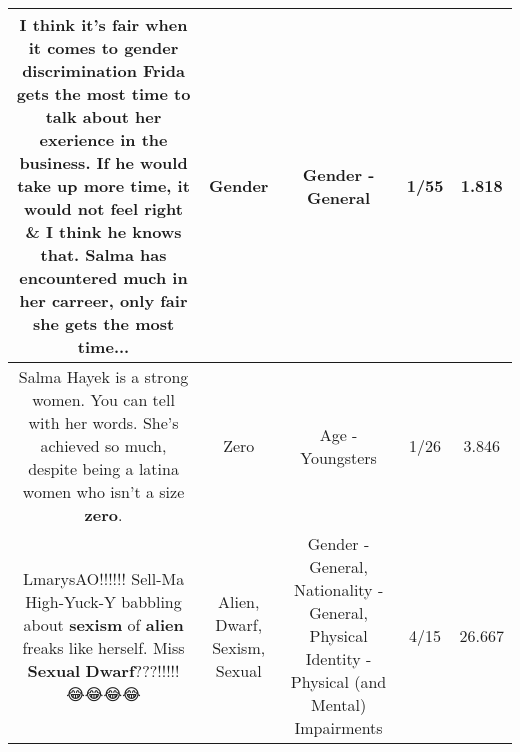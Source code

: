 \documentclass[11pt]{article}
\newlength\mylength
\begin{document}
\begin{center}
\begin{longtable}{|C{.65\mylength}|C{.30\mylength}|C{.12\mylength}|C{.12\mylength}|C{.12\mylength}|}
  \small I think it's fair when it comes to \textbf{gender} discrimination Frida gets the most time to talk about her exerience in the business. If he would take up more time, it would not feel right \& I think he knows that. Salma has encountered much in her carreer, only fair she gets the most time...\normalsize   & Gender & Gender - General & 1/55 & 1.818 \\  \hline
  \small Salma Hayek is a strong women. You can tell with her words. She's achieved so much, despite being a latina women who isn't a size \textbf{zero}.\normalsize   & Zero & Age - Youngsters & 1/26 & 3.846 \\  \hline
  \small LmarysAO!!!!!! Sell-Ma High-Yuck-Y babbling about \textbf{sexism} of \textbf{alien} freaks like herself. Miss \textbf{Sexual} \textbf{Dwarf}???!!!!! 😂😂😂😂\normalsize   & Alien, Dwarf, Sexism, Sexual & Gender - General, Nationality - General, Physical Identity - Physical (and Mental) Impairments & 4/15 & 26.667 \\  \hline

\end{longtable}
\end{center}
\end{document}

